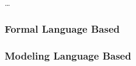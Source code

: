 \chapter{}
\label{sec:formal_methods}

\dots

\subsection{Formal Language Based}

\subsection{Modeling Language Based}